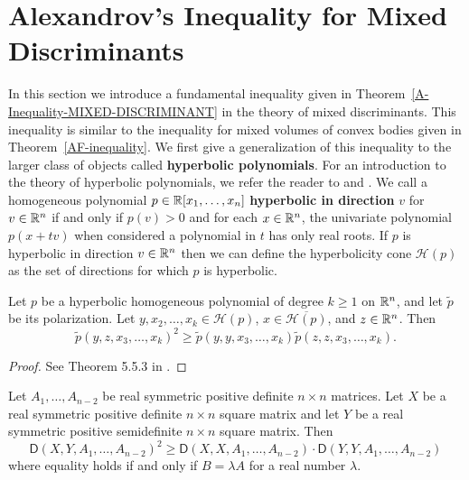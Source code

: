 \documentclass{puthesis-UG}
\begin{document}
\section{Alexandrov's Inequality for Mixed Discriminants}

In this section we introduce a fundamental inequality given in Theorem~\ref{A-Inequality-MIXED-DISCRIMINANT} in the theory of mixed discriminants. This inequality is similar to the inequality for mixed volumes of convex bodies given in Theorem~\ref{AF-inequality}. We first give a generalization of this inequality to the larger class of objects called \textbf{hyperbolic polynomials}. For an introduction to the theory of hyperbolic polynomials, we refer the reader to \cite{schneider_2013} and \cite{hyperbolic-polynomials}. We call a homogeneous polynomial $p \in \mathbb{R}[x_1, \ldots, x_n]$ \textbf{hyperbolic in direction} $v$ for $v \in \mathbb{R}^n$ if and only if $p(v) > 0$ and for each $x \in \mathbb{R}^n$, the univariate polynomial $p(x + tv)$ when considered a polynomial in $t$ has only real roots. If $p$ is hyperbolic in direction $v \in \mathbb{R}^n$ then we can define the hyperbolicity cone $\mathcal{H} (p)$ as the set of directions for which $p$ is hyperbolic. 

\begin{thm}
	Let $p$ be a hyperbolic homogeneous polynomial of degree $k \geq 1$ on $\mathbb{R}^n$, and let $\tilde{p}$ be its polarization. Let $y, x_2, \ldots, x_k \in \mathcal{H}(p)$, $x \in \overline{\mathcal{H}(p)}$, and $z \in \mathbb{R}^n$. Then 
	\[
		\widetilde{p}(y, z, x_3, \ldots, x_k)^2 \geq \widetilde{p}(y, y, x_3, \ldots, x_k) \widetilde{p} (z, z, x_3, \ldots, x_k).
	\]
\end{thm}

\begin{proof}
	See Theorem 5.5.3 in \cite{schneider_2013}.
\end{proof}

\begin{thm}  \label{A-Inequality-MIXED-DISCRIMINANT}
	Let $A_1, \ldots, A_{n-2}$ be real symmetric positive definite $n \times n$ matrices. Let $X$ be a real symmetric positive definite $n \times n$ square matrix and let $Y$ be a real symmetric positive semidefinite $n \times n$ square matrix. Then 
	\[
		\mathsf{D}(X, Y, A_1, \ldots, A_{n-2})^2 \geq \mathsf{D}(X, X, A_1, \ldots, A_{n-2}) \cdot \mathsf{D} (Y, Y, A_1, \ldots, A_{n-2})
	\]
	where equality holds if and only if $B = \lambda A$ for a real number $\lambda$. 
\end{thm}
\end{document}
